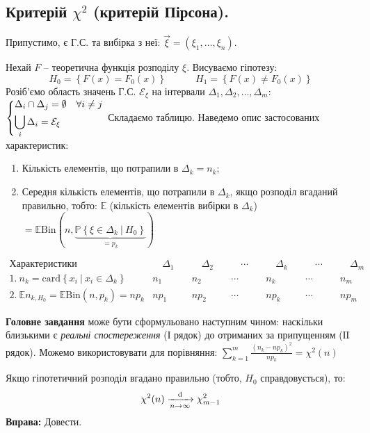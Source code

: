 \subsection{Критерій \(\chi^2\) (критерій Пірсона).}
Припустимо, є Г.С. та вибірка з неї: $\overrightarrow{ \xi} = (\xi_1, \dots, \xi_n)$. \par
Нехай $F$ -- теоретична функція розподілу $\xi$. Висуваємо гіпотезу:
$$
H_0 = \left\lbrace F(x) = F_0(x) \right\rbrace \qquad \quad H_1 = \left\lbrace F(x) \neq  F_0(x) \right\rbrace
$$
Розіб'ємо область значень Г.С. \( \mathcal{E}_\xi \) на інтервали $\Delta_1, \Delta_2, \dots, \Delta_m:$
  \ \(
   \begin{dcases}
    \Delta_i \cap \Delta_j = \emptyset \quad \forall i \neq j \\
    \bigcup_i \Delta_i =  \mathcal{E}_\xi
   \end{dcases}
  \)
Складаємо таблицю. Наведемо опис застосованих характеристик:
\begin{enumerate}
  \item Кількість елементів, що потрапили в $\Delta_k = n_k$;
  \item Середня кількість елементів, що потрапили в $\Delta_k$, якщо розподіл вгаданий правильно, тобто:
  \( \mathbb{E} \) (кількість елементів вибірки в \( \Delta_k \)) \(  = \mathbb{E} \mathrm{Bin}(n, \underbrace{\mathbb{P} \left\lbrace \xi \in \Delta_k \  \big| \  H_0 \right\rbrace}_{= p_k}) \)
\end{enumerate}
\[
 \begin{array}{l|c|c|c|c|c|c}
\text{Характеристики}   & \quad \Delta_1 \quad & \quad \Delta_2 \quad & \quad \cdots \quad & \quad \Delta_k \quad &\quad  \cdots \quad &\quad  \Delta_m \quad \\
\hline
1.\ n_k = \mathrm{card} \left\lbrace x_i \  \big| \   x_i \in \Delta_k \right\rbrace& n_1 &n_2 & \cdots & n_k& \cdots & n_m\\
\hline
2.\ \mathbb{E} n_{k, H_0}  = \mathbb{E} \mathrm{Bin}(n, p_k) = np_k
& np_1 &np_2 & \cdots & np_k& \cdots & np_m
 \end{array}
\]

\textbf{Головне завдання} може бути сформульовано наступним чином: наскільки близькими є \textit{реальні спостереження} (І рядок) до отриманих за припущенням (ІІ рядок).
Можемо використовувати для порівняння: \(  \sum\limits_{k=1}^{m}{ \frac{(n_k - np_k)^2}{np_k}} = \chi^2(n)\)
\begin{boxteo}
 Якщо гіпотетичний розподіл вгадано правильно (тобто, \( H_0 \) справдовується), то:
 $$
 \chi^2 (n) \xrightarrow[n \to \infty]{\mathrm{d}} \chi^2_{m-1}
 $$
 \textbf{Вправа:} Довести.
\end{boxteo}
